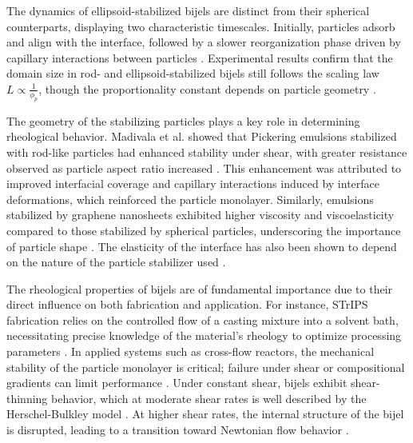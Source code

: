 The dynamics of ellipsoid-stabilized bijels are distinct from their spherical counterparts, displaying two characteristic timescales. Initially, particles adsorb and align with the interface, 
followed by a slower reorganization phase driven by capillary interactions between particles \cite{gunther_timescales_2014}. Experimental results confirm that the domain size in rod- and ellipsoid-stabilized 
bijels still follows the scaling law $L \propto \frac{1}{\phi_p}$, though the proportionality constant depends on particle geometry \cite{hijnen_bijels_2015, madivala_exploiting_2009, daware_emulsions_2015}.

The geometry of the stabilizing particles plays a key role in determining rheological behavior. Madivala et al. showed that Pickering emulsions stabilized with rod-like particles had enhanced stability under 
shear, with greater resistance observed as particle aspect ratio increased \cite{madivala_exploiting_2009}. This enhancement was attributed to improved interfacial coverage and capillary interactions induced by 
interface deformations, which reinforced the particle monolayer. Similarly, emulsions stabilized by graphene nanosheets exhibited higher viscosity and viscoelasticity compared to those stabilized by spherical 
particles, underscoring the importance of particle shape \cite{imperiali_simple_2014}. The elasticity of the interface has also been shown to depend on the nature of the particle stabilizer used 
\cite{sun_assembly_2013}.

The rheological properties of bijels are of fundamental importance due to their direct influence on both fabrication and application. For instance, STrIPS fabrication relies on the controlled flow of a 
casting mixture into a solvent bath, necessitating precise knowledge of the material's rheology to optimize processing parameters \cite{haase_situ_2016, haase_continuous_2015}. In applied systems such as 
cross-flow reactors, the mechanical stability of the particle monolayer is critical; failure under shear or compositional gradients can limit performance \cite{boakye-ansah_controlling_2020}. Under constant 
shear, bijels exhibit shear-thinning behavior, which at moderate shear rates is well described by the Herschel-Bulkley model \cite{macmillan_rheological_2019, wang_morphology_2023}. At higher shear rates, the 
internal structure of the bijel is disrupted, leading to a transition toward Newtonian flow behavior \cite{cai_bijels_2017, bonaccorso_shear_2020}.

